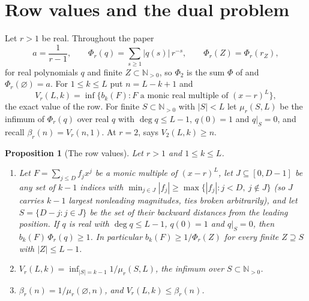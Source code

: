 \documentclass[11pt]{article}
\newtheorem{proposition}[theorem]{Proposition}
\newcommand{\N}{\mathbb N}
\begin{document}
\section{Row values and the dual problem}\label{sec:rowvalues}

Let $r>1$ be real.  Throughout the paper
\[
  a=\frac1{r-1},\qquad
  \Phi_r(q)=\sum_{s\ge1}|q(s)|\,r^{-s},\qquad
  \Phi_r(Z)=\Phi_r(r_Z),
\]
for real polynomials $q$ and finite $Z\subset\N_{>0}$, so $\Phi_2$ is the sum $\Phi$ of \cite[Section~4.4]{coefficient-mass} and
$\Phi_r(\varnothing)=a$.  For
$1\le k\le L$ put $n=L-k+1$ and
\[
  V_r(L,k)=\inf\{b_k(F): F\text{ a monic real multiple of }(x-r)^L\},
\]
the exact value of the row.  For finite $S\subset\N_{>0}$ with $|S|<L$ let
$\mu_r(S,L)$ be the infimum of $\Phi_r(q)$ over real $q$ with $\deg q\le L-1$,
$q(0)=1$ and $q|_S=0$, and recall $\beta_r(n)=V_r(n,1)$.  At
$r=2$, \cite[Theorem~4.13]{coefficient-mass} says $V_2(L,k)\ge n$.

\begin{proposition}[The row values]\label{prop:rowvalue}
Let $r>1$ and $1\le k\le L$.
\begin{enumerate}
\item[(a)] Let $F=\sum_{j\le D}f_jx^j$ be a monic multiple of $(x-r)^L$,
let $J\subseteq[0,D-1]$ be any set of $k-1$ indices with
$\min_{j\in J}|f_j|\ge\max\{|f_j|:j<D,\ j\notin J\}$ (so $J$ carries $k-1$
largest nonleading magnitudes, ties broken arbitrarily), and let
$S=\{D-j:j\in J\}$ be the set of their backward distances from the leading
position.  If $q$ is real with $\deg q\le L-1$, $q(0)=1$ and $q|_S=0$, then
$b_k(F)\,\Phi_r(q)\ge1$.  In particular $b_k(F)\ge1/\Phi_r(Z)$ for every
finite $Z\supseteq S$ with $|Z|\le L-1$.
\item[(b)] $V_r(L,k)=\inf_{|S|=k-1}1/\mu_r(S,L)$, the infimum over
$S\subset\N_{>0}$.
\item[(c)] $\beta_r(n)=1/\mu_r(\varnothing,n)$, and $V_r(L,k)\le\beta_r(n)$.
\end{enumerate}
\end{proposition}
\end{document}
